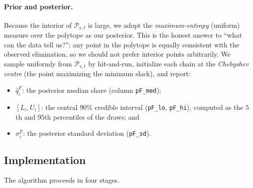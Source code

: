 \documentclass{article}
\begin{document}
\paragraph{Prior and posterior.} Because the interior of $\mathcal{P}_{s,t}$ is large, we
adopt the \emph{maximum-entropy} (uniform) measure over the polytope as our posterior. This
is the honest answer to ``what can the data tell us?'': any point in the polytope is
equally consistent with the observed elimination, so we should not prefer interior points
arbitrarily. We sample uniformly from $\mathcal{P}_{s,t}$ by hit-and-run, initialize each
chain at the \emph{Chebyshev centre} (the point maximizing the minimum slack), and report:
\begin{itemize}
\item $\hat q^{F}_{i}$: the posterior median share (column \texttt{pF\_med});
\item $[L_{i}, U_{i}]$: the central $90\%$ credible interval (\texttt{pF\_lo},
\texttt{pF\_hi}), computed as the $5$th and $95$th percentiles of the draws; and
\item $\sigma^{F}_{i}$: the posterior standard deviation (\texttt{pF\_sd}).
\end{itemize}

\subsection{Implementation}

The algorithm proceeds in four stages.
\end{document}
